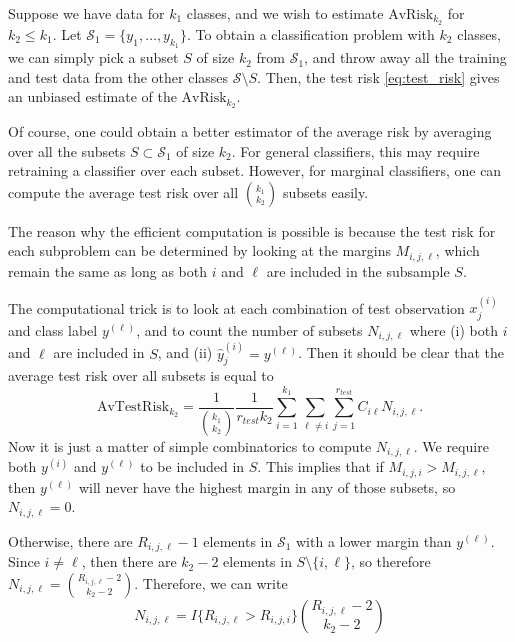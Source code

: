 \documentclass[12pt]{article}
\begin{document}
Suppose we have data for $k_1$ classes, and we wish to estimate
$\text{AvRisk}_{k_2}$ for $k_2 \leq k_1$.  Let $\mathcal{S}_1
= \{y_1,\hdots,y_{k_1}\}$.  To obtain a classification problem with
$k_2$ classes, we can simply pick a subset $S$ of size $k_2$ from
$\mathcal{S}_1$, and throw away all the training and test data from the
other classes $\mathcal{S}\setminus S$.  Then, the test
risk \eqref{eq:test_risk} gives an unbiased estimate of the
$\text{AvRisk}_{k_2}$.

Of course, one could obtain a better estimator of the average risk by
averaging over all the subsets $S \subset \mathcal{S}_1$ of size
$k_2$.  For general classifiers, this may require retraining a
classifier over each subset.  However, for marginal classifiers, one
can compute the average test risk over all ${k_1}\choose{k_2}$ subsets
easily.

The reason why the efficient computation is possible is because the
test risk for each subproblem can be determined by looking at the
margins $M_{i, j, \ell}$, which remain the same as long as both $i$
and $\ell$ are included in the subsample $S$.

The computational trick is to look at each combination of test
observation $x_j^{(i)}$ and class label $y^{(\ell)}$, and to count the
number of subsets $N_{i, j, \ell}$ where (i) both $i$ and $\ell$ are
included in $S$, and (ii) $\hat{y}_j^{(i)} = y^{(\ell)}$.  Then it
should be clear that the average test risk over all subsets is equal
to
\begin{equation}\label{eq:avtestrisk}
\text{AvTestRisk}_{k_2} = \frac{1}{{{k_1}\choose{k_2}}}\frac{1}{r_{test}k_2} \sum_{i=1}^{k_1} \sum_{\ell\neq i} \sum_{j=1}^{r_{test}} C_{i\ell}N_{i, j, \ell}.
\end{equation}
Now it is just a matter of simple combinatorics to compute
$N_{i,j,\ell}$.  We require both $y^{(i)}$ and $y^{(\ell)}$ to be
included in $S$.  This implies that if $M_{i,j,i} > M_{i,j,\ell}$,
then $y^{(\ell)}$ will never have the highest margin in any of those
subsets, so $N_{i,j,\ell} = 0$.

Otherwise, there are $R_{i,j,\ell} - 1$ elements in $\mathcal{S}_1$
with a lower margin than $y^{(\ell)}$.  Since $i \neq \ell$, then there
are $k_2-2$ elements in $S \setminus \{i, \ell\}$, so therefore $N_{i,
j, \ell} = {{R_{i,j,\ell} - 2}\choose{k_2 - 2}}$.  Therefore, we can write
\begin{equation}\label{eq:avtestrisk_nil}
N_{i,j,\ell} = I\{R_{i,j,\ell} > R_{i,j,i}\}{{R_{i,j,\ell} -2}\choose{k_2 - 2}}
\end{equation}
\end{document}
